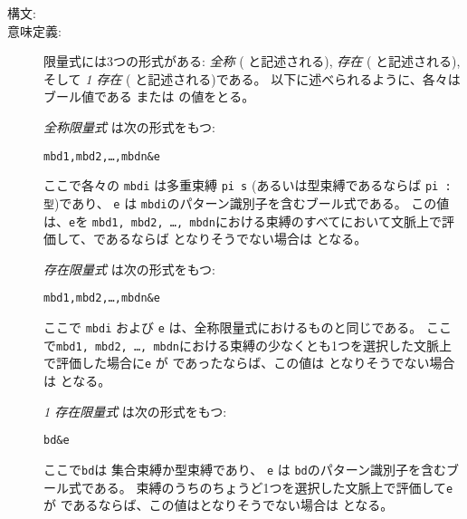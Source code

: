 \documentclass[\pformat,12pt]{jarticle}
\begin{document}
\begin{description}
\item[構文:]


    



\item[意味定義:] 限量式には3つの形式がある:
  {\it 全称} ( と記述される), {\it 存在} ( と記述される), そして {\it 1 存在} ( と記述される)である。
以下に述べられるように、各々はブール値である  または の値をとる。

   {\it 全称限量式} は次の形式をもつ:
  \begin{alltt}
     mbd1, mbd2, \ldots, mbdn \& e
  \end{alltt}
  ここで各々の {\tt mbdi} は多重束縛 {\tt pi  s} (あるいは型束縛であるならば {\tt pi : 型})であり、 {\tt e} は {\tt mbdi}のパターン識別子を含むブール式である。 
この値は、{\tt e}を {\tt mbd1, mbd2, \ldots,
    mbdn}における束縛のすべてにおいて文脈上で評価して、であるならば となりそうでない場合は となる。

   {\it 存在限量式} は次の形式をもつ:
  \begin{alltt}
     mbd1, mbd2, \ldots, mbdn \& e
  \end{alltt}
  ここで {\tt mbdi} および {\tt e} は、全称限量式におけるものと同じである。
ここで{\tt mbd1, mbd2, \ldots, mbdn}における束縛の少なくとも1つを選択した文脈上で評価した場合に{\tt e} が であったならば、この値は  となりそうでない場合は  となる。

   {\it 1 存在限量式} は次の形式をもつ:
  \begin{alltt}
     bd \& e
  \end{alltt}
  ここで{\tt bd}は 集合束縛か型束縛であり、 {\tt e} は {\tt bd}のパターン識別子を含むブール式である。
束縛のうちのちょうど1つを選択した文脈上で評価して{\tt e} が  であるならば、この値はとなりそうでない場合は  となる。


\end{description}
\end{document}
